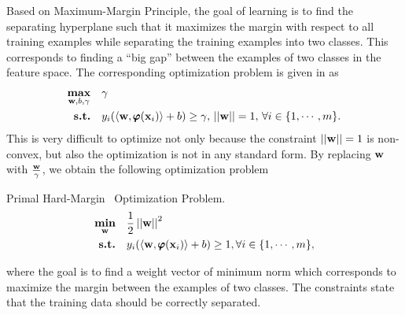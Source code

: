 {Based on Maximum-Margin Principle, the goal of learning is to find the separating hyperplane such that it maximizes the margin with respect to all training examples while separating the training examples into two classes.
This corresponds to finding a ``big gap'' between the examples of two classes in the feature space.
The corresponding optimization problem is given in \citep{Bishop07} as
\begin{align*}
	\underset{\mathbf {w},b,\gamma}{\textbf{max}} &\quad \gamma\\
	\textbf{s.t.} &\quad y_i(\langle \mathbf {w}, \pmb \varphi(\mathbf {x}_i) \rangle+b) \ge \gamma, \, \left|\left| \mathbf {w} \right|\right|=1, \, \forall i\in\{1,\cdots,m\}.
\end{align*}
This is very difficult to optimize not only because the constraint $\left|\left| \mathbf {w} \right|\right|=1$ is non-convex, but also the optimization is not in any standard form.
By replacing $\mathbf {w}$ with $\frac{\mathbf {w}}{\gamma}$, we obtain the following optimization problem

\begin{definition}{Primal Hard-Margin \svm\ Optimization Problem.}\label{hardsvmprimal}
	\begin{align*}
		\underset{\mathbf {w}}{\textbf{min}} & \quad\frac{1}{2}\left|\left| \mathbf {w} \right|\right|^2\\
		\textbf{s.t.} & \quad y_i(\langle \mathbf {w}, \pmb \varphi(\mathbf {x}_i) \rangle + b) \ge 1, \forall i\in\{1,\cdots,m\},
	\end{align*}
\end{definition}
\noindent
where the goal is to find a weight vector of minimum norm which corresponds to maximize the margin between the examples of two classes.
The constraints state that the training data should be correctly separated.

}
